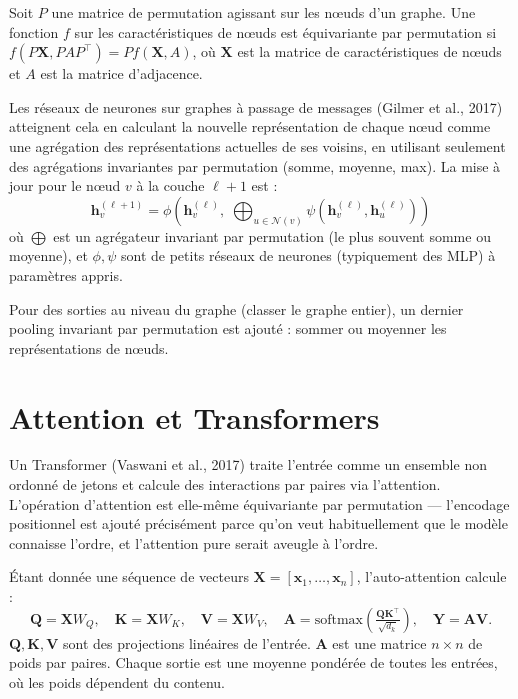\begin{definition}
Soit $P$ une matrice de permutation agissant sur les nœuds d'un graphe. Une fonction $f$ sur les caractéristiques de nœuds est équivariante par permutation si $f(P \bm{X}, P A P^\top) = P f(\bm{X}, A)$, où $\bm{X}$ est la matrice de caractéristiques de nœuds et $A$ est la matrice d'adjacence.
\end{definition}

Les réseaux de neurones sur graphes à passage de messages (Gilmer et al., 2017) atteignent cela en calculant la nouvelle représentation de chaque nœud comme une agrégation des représentations actuelles de ses voisins, en utilisant seulement des agrégations invariantes par permutation (somme, moyenne, max). La mise à jour pour le nœud $v$ à la couche $\ell+1$ est :
\[
\bm{h}_v^{(\ell+1)} = \phi\!\left( \bm{h}_v^{(\ell)}, \; \bigoplus_{u \in \mathcal{N}(v)} \psi(\bm{h}_v^{(\ell)}, \bm{h}_u^{(\ell)}) \right)
\]
où $\bigoplus$ est un agrégateur invariant par permutation (le plus souvent somme ou moyenne), et $\phi, \psi$ sont de petits réseaux de neurones (typiquement des MLP) à paramètres appris.

Pour des sorties au niveau du graphe (classer le graphe entier), un dernier pooling invariant par permutation est ajouté : sommer ou moyenner les représentations de nœuds.

\section{Attention et Transformers}

Un Transformer (Vaswani et al., 2017) traite l'entrée comme un ensemble non ordonné de jetons et calcule des interactions par paires via l'attention. L'opération d'attention est elle-même équivariante par permutation --- l'encodage positionnel est ajouté précisément parce qu'on veut habituellement que le modèle connaisse l'ordre, et l'attention pure serait aveugle à l'ordre.

\begin{definition}
Étant donnée une séquence de vecteurs $\bm{X} = [\bm{x}_1, \ldots, \bm{x}_n]$, l'auto-attention calcule :
\[
\bm{Q} = \bm{X} W_Q, \quad \bm{K} = \bm{X} W_K, \quad \bm{V} = \bm{X} W_V, \quad \bm{A} = \mathrm{softmax}\!\left( \tfrac{\bm{Q} \bm{K}^\top}{\sqrt{d_k}} \right), \quad \bm{Y} = \bm{A} \bm{V}.
\]
$\bm{Q}, \bm{K}, \bm{V}$ sont des projections linéaires de l'entrée. $\bm{A}$ est une matrice $n \times n$ de poids par paires. Chaque sortie est une moyenne pondérée de toutes les entrées, où les poids dépendent du contenu.
\end{definition}

